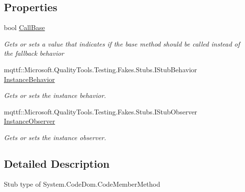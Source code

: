 \subsection*{Properties}
\begin{DoxyCompactItemize}
\item 
bool \hyperlink{class_system_1_1_code_dom_1_1_fakes_1_1_stub_code_member_method_ad7badc0571b12465d0a95f175ef33a0a}{Call\-Base}
\begin{DoxyCompactList}\small\item\em Gets or sets a value that indicates if the base method should be called instead of the fallback behavior\end{DoxyCompactList}\item 
mqttf\-::\-Microsoft.\-Quality\-Tools.\-Testing.\-Fakes.\-Stubs.\-I\-Stub\-Behavior \hyperlink{class_system_1_1_code_dom_1_1_fakes_1_1_stub_code_member_method_a33e997f7fa4936bf227517fb62f5f45a}{Instance\-Behavior}
\begin{DoxyCompactList}\small\item\em Gets or sets the instance behavior.\end{DoxyCompactList}\item 
mqttf\-::\-Microsoft.\-Quality\-Tools.\-Testing.\-Fakes.\-Stubs.\-I\-Stub\-Observer \hyperlink{class_system_1_1_code_dom_1_1_fakes_1_1_stub_code_member_method_ad664e22635389cf785c2a457118a716d}{Instance\-Observer}
\begin{DoxyCompactList}\small\item\em Gets or sets the instance observer.\end{DoxyCompactList}\end{DoxyCompactItemize}


\subsection{Detailed Description}
Stub type of System.\-Code\-Dom.\-Code\-Member\-Method



